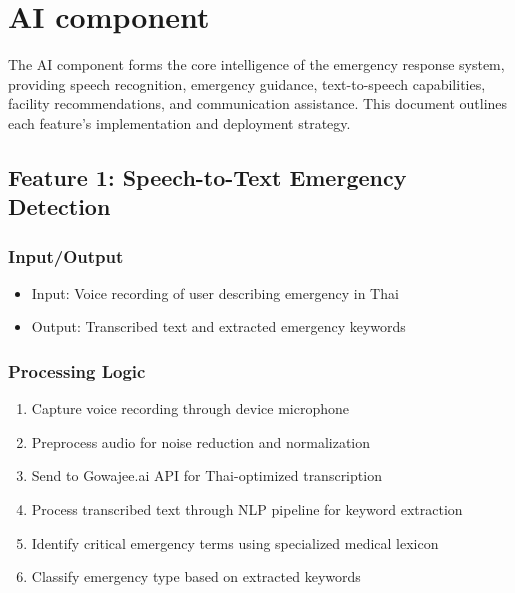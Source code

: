 
\section{AI component}
\label{section:ai-component}

The AI component forms the core intelligence of the emergency response system, providing speech recognition, emergency guidance, text-to-speech capabilities, facility recommendations, and communication assistance. This document outlines each feature's implementation and deployment strategy.

\subsection{Feature 1: Speech-to-Text Emergency Detection}

    \subsubsection{Input/Output}
    \begin{itemize}
        \item Input:  Voice recording of user describing emergency in Thai
        \item Output: Transcribed text and extracted emergency keywords
    \end{itemize}

    \subsubsection{Processing Logic}
    \begin{enumerate}
        \item Capture voice recording through device microphone
        \item Preprocess audio for noise reduction and normalization
        \item Send to Gowajee.ai API for Thai-optimized transcription
        \item Process transcribed text through NLP pipeline for keyword extraction
        \item Identify critical emergency terms using specialized medical lexicon
        \item Classify emergency type based on extracted keywords
    \end{enumerate}

